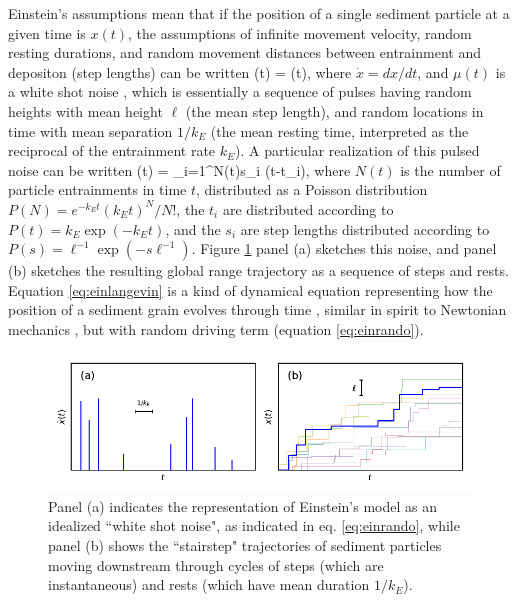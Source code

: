 Einstein's assumptions mean that if the position of a single sediment particle at a given time is $x(t)$, the assumptions of infinite movement velocity, random resting durations, and random movement distances between entrainment and depositon (step lengths) can be written
\be {}(t) = \mu(t), \label{eq:einlangevin}\ee
where $\dot{x} = dx/dt$, and $\mu(t)$ is a white shot noise \citep{VanDenBroeck1983}, which is essentially a sequence of pulses having random heights with mean height $\ell$ (the mean step length), and random locations in time with mean separation $1/k_E$ (the mean resting time, interpreted as the reciprocal of the entrainment rate $k_E$).
A particular realization of this pulsed noise can be written
\be \mu(t) = \sum_{i=1}^{N(t)}s_i \delta(t-t_i), \label{eq:einrando} \ee
where $N(t)$ is the number of particle entrainments in time $t$, distributed as a Poisson distribution $P(N) = e^{-k_E t} (k_E t)^N/N!$, the $t_i$ are distributed according to $P(t) = k_E\exp(-k_E t)$, and the $s_i$ are step lengths distributed according to $P(s) = \ell^{-1}\exp(-s \ell^{-1}).$
Figure \ref{fig:einsteinfig} panel (a) sketches this noise, and panel (b) sketches the resulting global range trajectory as a sequence of steps and rests.
Equation \ref{eq:einlangevin} is a kind of dynamical equation representing how the position of a sediment grain evolves through time \citep{Kubo1978}, similar in spirit to Newtonian mechanics \citep{Goldstein1956}, but with random driving term (equation \ref{eq:einrando}).
\begin{figure}[!htbp]
	\includegraphics[width=\linewidth,keepaspectratio]{./figures/ch1/einsteinConcept.pdf}
	\caption{Panel (a) indicates the representation of Einstein's model as an idealized ``white shot noise", as indicated in eq. \ref{eq:einrando}, while panel (b) shows the ``stairstep" trajectories of sediment particles moving downstream through cycles of steps (which are instantaneous) and rests (which have mean duration $1/k_E$). }
	\label{fig:einsteinfig}
\end{figure}

